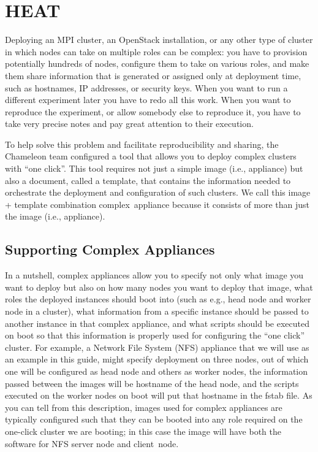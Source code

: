 \chapter{HEAT}

\label{C:cc-heat}

\FILENAME

Deploying an MPI cluster, an OpenStack installation, or any other type
of cluster in which nodes can take on multiple roles can be complex: you
have to provision potentially hundreds of nodes, configure them to take
on various roles, and make them share information that is generated or
assigned only at deployment time, such as hostnames, IP addresses, or
security keys. When you want to run a different experiment later you
have to redo all this work. When you want to reproduce the experiment,
or allow somebody else to reproduce it, you have to take very precise
notes and pay great attention to their execution.

To help solve this problem and facilitate reproducibility and sharing,
the Chameleon team configured a tool that allows you to deploy complex
clusters with ``one click''. This tool requires not just a simple image
(i.e., appliance) but also a document, called a template, that contains
the information needed to orchestrate the deployment and configuration
of such clusters. We call this image + template combination
complex~appliance because it consists of more than just the image (i.e.,
appliance).

\section{Supporting Complex Appliances}

In a nutshell, complex appliances allow you to specify not only what
image you want to deploy but also on how many nodes you want to deploy
that image, what roles the deployed instances should boot into (such as
e.g., head node and worker node in a cluster), what information from a
specific instance should be passed to another instance in that complex
appliance, and what scripts should be executed on boot so that this
information is properly used for configuring the ``one click'' cluster.
For example, a Network File System (NFS) appliance that we will use as
an example in this guide, might specify deployment on three nodes, out
of which one will be configured as head node and others as worker nodes,
the information passed between the images will be hostname of the head
node, and the scripts executed on the worker nodes on boot will put that
hostname in the fstab file. As you can tell from this description,
images used for complex appliances are typically configured such that
they can be booted into any role required on the one-click cluster we
are booting; in this case the image will have both the software for NFS
server node and client~node.

